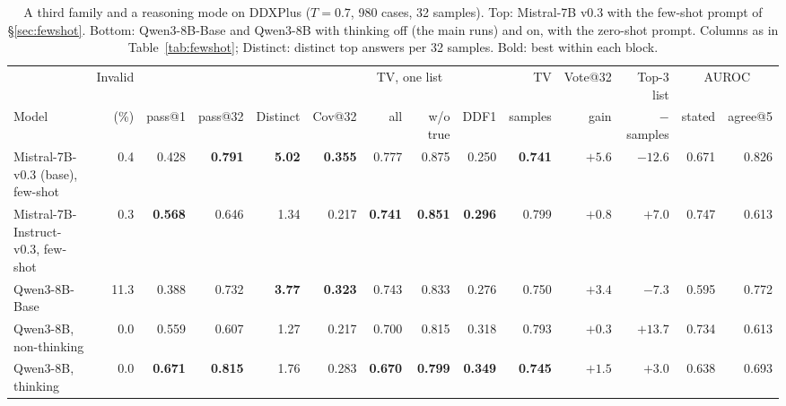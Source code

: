\documentclass[wcp]{jmlr}
\begin{document}
\begin{table}[t]
\centering
\begin{adjustbox}{max width=\textwidth}
\begin{tabular}{lrrrrrrrrrrrrr}
\toprule
 & Invalid & & & & & \multicolumn{2}{c}{TV, one list} & & TV & Vote@32 & Top-3 list & \multicolumn{2}{c}{AUROC} \\
Model & (\%) & pass@1 & pass@32 & Distinct & Cov@32 & all & w/o true & DDF1 & samples & gain & $-$ samples & stated & agree@5 \\
\midrule
Mistral-7B-v0.3 (base), few-shot & 0.4 & 0.428 & \textbf{0.791} & \textbf{5.02} & \textbf{0.355} & 0.777 & 0.875 & 0.250 & \textbf{0.741} & $+5.6$ & $-12.6$ & 0.671 & 0.826 \\
Mistral-7B-Instruct-v0.3, few-shot & 0.3 & \textbf{0.568} & 0.646 & 1.34 & 0.217 & \textbf{0.741} & \textbf{0.851} & \textbf{0.296} & 0.799 & $+0.8$ & $+7.0$ & 0.747 & 0.613 \\
\midrule
Qwen3-8B-Base & 11.3 & 0.388 & 0.732 & \textbf{3.77} & \textbf{0.323} & 0.743 & 0.833 & 0.276 & 0.750 & $+3.4$ & $-7.3$ & 0.595 & 0.772 \\
Qwen3-8B, non-thinking & 0.0 & 0.559 & 0.607 & 1.27 & 0.217 & 0.700 & 0.815 & 0.318 & 0.793 & $+0.3$ & $+13.7$ & 0.734 & 0.613 \\
Qwen3-8B, thinking & 0.0 & \textbf{0.671} & \textbf{0.815} & 1.76 & 0.283 & \textbf{0.670} & \textbf{0.799} & \textbf{0.349} & \textbf{0.745} & $+1.5$ & $+3.0$ & 0.638 & 0.693 \\
\bottomrule
\end{tabular}
\end{adjustbox}
\caption{A third family and a reasoning mode on DDXPlus ($T{=}0.7$, 980 cases, 32 samples). Top: Mistral-7B v0.3 with the few-shot prompt of \S\ref{sec:fewshot}. Bottom: Qwen3-8B-Base and Qwen3-8B with thinking off (the main runs) and on, with the zero-shot prompt. Columns as in Table~\ref{tab:fewshot}; Distinct: distinct top answers per 32 samples. Bold: best within each block.}
\label{tab:third}
\end{table}
\end{document}
